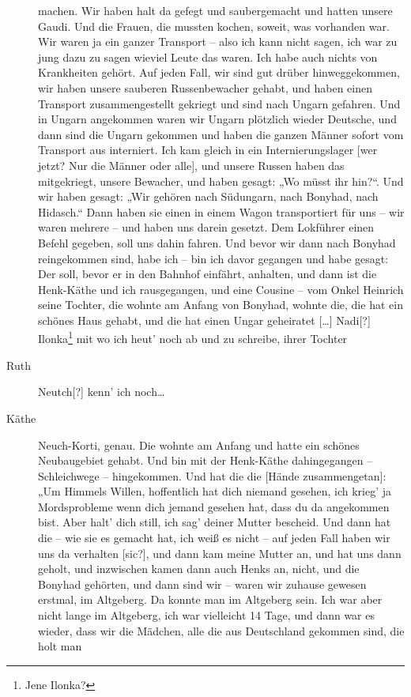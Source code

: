 \documentclass[ngerman,]{article}
\begin{document}
\begin{multicols}{2}
\begin{description}
machen. Wir haben halt da gefegt und saubergemacht und hatten unsere
Gaudi. Und die Frauen, die mussten kochen, soweit, was vorhanden war.
Wir waren ja ein ganzer Transport – also ich kann nicht sagen, ich war
zu jung dazu zu sagen wieviel Leute das waren. Ich habe auch nichts von
Krankheiten gehört. Auf jeden Fall, wir sind gut drüber hinweggekommen,
wir haben unsere sauberen Russenbewacher gehabt, und haben einen
Transport zusammengestellt gekriegt und sind nach Ungarn gefahren. Und
in Ungarn angekommen waren wir Ungarn plötzlich wieder Deutsche, und
dann sind die Ungarn gekommen und haben die ganzen Männer sofort vom
Transport aus interniert. Ich kam gleich in ein Internierungslager
{[}wer jetzt? Nur die Männer oder alle{]}, und unsere Russen haben das
mitgekriegt, unsere Bewacher, und haben gesagt: „Wo müsst ihr hin?“. Und
wir haben gesagt: „Wir gehören nach Südungarn, nach Bonyhad, nach
Hidasch.“ Dann haben sie einen in einem Wagon transportiert für uns –
wir waren mehrere – und haben uns darein gesetzt. Dem Lokführer einen
Befehl gegeben, soll uns dahin fahren. Und bevor wir dann nach Bonyhad
reingekommen sind, habe ich – bin ich davor gegangen und habe gesagt:
Der soll, bevor er in den Bahnhof einfährt, anhalten, und dann ist die
Henk-Käthe und ich rausgegangen, und eine Cousine – vom Onkel Heinrich
seine Tochter, die wohnte am Anfang von Bonyhad, wohnte die, die hat ein
schönes Haus gehabt, und die hat einen Ungar geheiratet {[}\ldots{}{]}
Nadi{[}?{]} Ilonka\footnote{Jene Ilonka?} mit wo ich heut' noch ab und
zu schreibe, ihrer Tochter
\item[Ruth]
Neutch{[}?{]} kenn' ich noch\ldots{}
\item[Käthe]
Neuch-Korti, genau. Die wohnte am Anfang und hatte ein schönes
Neubaugebiet gehabt. Und bin mit der Henk-Käthe dahingegangen –
Schleichwege – hingekommen. Und hat die die {[}Hände zusammengetan{]}:
„Um Himmels Willen, hoffentlich hat dich niemand gesehen, ich krieg' ja
Mordsprobleme wenn dich jemand gesehen hat, dass du da angekommen bist.
Aber halt' dich still, ich sag' deiner Mutter bescheid. Und dann hat die
– wie sie es gemacht hat, ich weiß es nicht – auf jeden Fall haben wir
uns da verhalten {[}sic?{]}, und dann kam meine Mutter an, und hat uns
dann geholt, und inzwischen kamen dann auch Henks an, nicht, und die
Bonyhad gehörten, und dann sind wir – waren wir zuhause gewesen erstmal,
im Altgeberg. Da konnte man im Altgeberg sein. Ich war aber nicht lange
im Altgeberg, ich war vielleicht 14 Tage, und dann war es wieder, dass
wir die Mädchen, alle die aus Deutschland gekommen sind, die holt man

\end{description}
\end{multicols}
\end{document}
